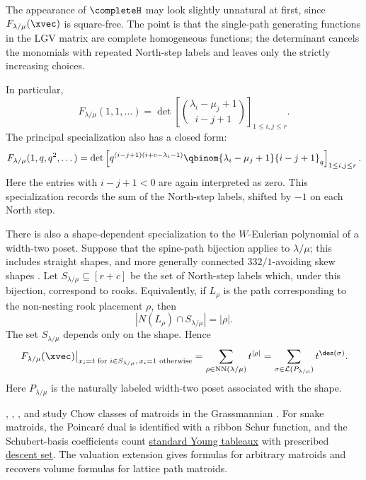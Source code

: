 \begin{remark}[Caveat]
The appearance of $\completeH$ may look slightly unnatural at first, since
$F_{\lambda/\mu}(\xvec)$ is square-free. The point is that the single-path
generating functions in the LGV matrix are complete homogeneous functions;
the determinant cancels the monomials with repeated North-step labels and
leaves only the strictly increasing choices.
\end{remark}

In particular,
\[
  F_{\lambda/\mu}(1,1,\dotsc)
  =
  \det \left[
    \binom{\lambda_i-\mu_j+1}{i-j+1}
  \right]_{1\leq i,j \leq r}.
\]
The principal specialization also has a closed form:
\[
  F_{\lambda/\mu}(1,q,q^2,\dotsc)
  =
  \det\left[
    q^{(i-j+1)(i+c-\lambda_i-1)}
    \qbinom{\lambda_i-\mu_j+1}{i-j+1}_q
  \right]_{1\leq i,j \leq r}.
\]
Here the entries with $i-j+1 \lt 0$ are again interpreted as zero.
This specialization records the sum of the North-step labels, shifted by
$-1$ on each North step.

There is also a shape-dependent specialization to the $W$-Eulerian polynomial
of a width-two poset. Suppose that the spine-path bijection applies to
$\lambda/\mu$; this includes straight shapes, and more generally connected
$332/1$-avoiding skew shapes \cite{AlexanderssonJal2024x}. Let
$S_{\lambda/\mu}\subseteq [r+c]$ be the set of North-step labels which,
under this bijection, correspond to rooks. Equivalently, if $L_\rho$ is
the path corresponding to the non-nesting rook placement $\rho$, then
\[
  |N(L_\rho)\cap S_{\lambda/\mu}|=|\rho|.
\]
The set $S_{\lambda/\mu}$ depends only on the shape. Hence
\[
  \left.
  F_{\lambda/\mu}(\xvec)
  \right|_{x_i=t\text{ for }i\in S_{\lambda/\mu},\,
           x_i=1\text{ otherwise}}
  =
  \sum_{\rho\in \mathrm{NN}(\lambda/\mu)} t^{|\rho|}
  =
  \sum_{\sigma\in \mathcal{L}(P_{\lambda/\mu})} t^{\des(\sigma)}.
\]
Here $P_{\lambda/\mu}$ is the naturally labeled width-two poset associated
with the shape.

, , , and
 study Chow classes of matroids in the Grassmannian
\cite{HamreSchroterVecchiVerkama2025x}.  For snake matroids, the Poincaré
dual is identified with a ribbon Schur function, and the Schubert-basis
coefficients count \hyperref[standardYoungTableau]{standard Young tableaux}
with prescribed \hyperref[descentSet]{descent set}.  The
valuation extension gives formulas for arbitrary matroids and recovers volume
formulas for lattice path matroids.

